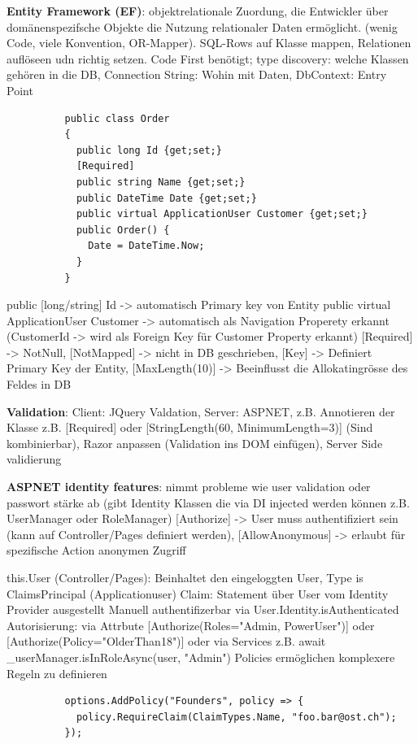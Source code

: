 \documentclass[10pt,landscape]{article}
\begin{document}
\begin{multicols}{3}
        \textbf{Entity Framework (EF)}: objektrelationale Zuordung, die Entwickler über domänenspezifsche Objekte die Nutzung relationaler Daten ermöglicht. (wenig Code, viele Konvention, OR-Mapper). SQL-Rows auf Klasse mappen, Relationen auflöseen udn richtig setzen.
        Code First benötigt; type discovery: welche Klassen gehören in die DB, Connection String: Wohin mit Daten, DbContext: Entry Point
        \begin{lstlisting}
          public class Order
          {
            public long Id {get;set;}
            [Required]
            public string Name {get;set;}
            public DateTime Date {get;set;}
            public virtual ApplicationUser Customer {get;set;}
            public Order() {
              Date = DateTime.Now;
            }
          }
        \end{lstlisting}
        public [long/string] Id -> automatisch Primary key von Entity
        public virtual ApplicationUser Customer -> automatisch als Navigation Properety erkannt (CustomerId -> wird als Foreign Key für Customer Property erkannt)
        [Required] -> NotNull, [NotMapped] -> nicht in DB geschrieben, [Key] -> Definiert Primary Key der Entity, [MaxLength(10)] -> Beeinflusst die Allokatingrösse des Feldes in DB

        \textbf{Validation}: Client: JQuery Valdation, Server: ASPNET, z.B. Annotieren der Klasse z.B. [Required] oder [StringLength(60, MinimumLength=3)] (Sind kombinierbar), Razor anpassen (Validation ins DOM einfügen), Server Side validierung

        \textbf{ASPNET identity features}: nimmt probleme wie user validation oder passwort stärke ab (gibt Identity Klassen die via DI injected werden können z.B. UserManager oder RoleManager)
        [Authorize] -> User muss authentifiziert sein (kann auf Controller/Pages definiert werden), [AllowAnonymous] -> erlaubt für spezifische Action anonymen Zugriff

        this.User (Controller/Pages): Beinhaltet den eingeloggten User, Type is ClaimsPrincipal (Applicationuser)
        Claim: Statement über User vom Identity Provider ausgestellt
        Manuell authentifizerbar via User.Identity.isAuthenticated
        Autorisierung: via Attrbute [Authorize(Roles="Admin, PowerUser")] oder [Authorize(Policy="OlderThan18")] oder via Services z.B. await \_userManager.isInRoleAsync(user, "Admin")
        Policies ermöglichen komplexere Regeln zu definieren
        \begin{lstlisting}
          options.AddPolicy("Founders", policy => {
            policy.RequireClaim(ClaimTypes.Name, "foo.bar@ost.ch");
          });
        \end{lstlisting}
    \end{multicols}
\end{document}
